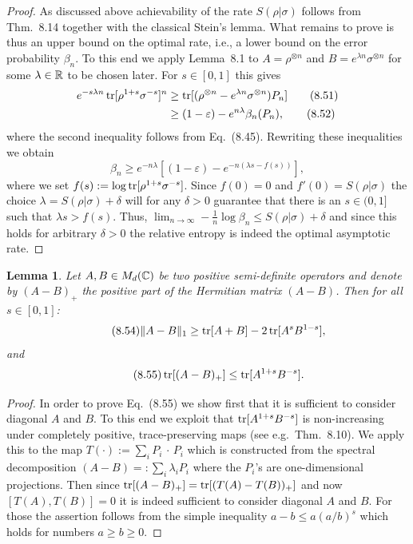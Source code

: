 \documentclass[11pt,a4paper]{article}
\theoremstyle{plain}
\newtheorem{lemma}{Lemma}[section]
\theoremstyle{definition}
\theoremstyle{remark}
\begin{document}
\begin{proof}
    As discussed above achievability of the rate $S(\rho|\sigma)$ follows from Thm.~8.14 together with the classical Stein's lemma.
    What remains to prove is thus an upper bound on the optimal rate, i.e., a lower bound on the error probability $\beta_n$.
    To this end we apply Lemma~8.1 to $A=\rho^{\otimes n}$ and $B=e^{\lambda n}\sigma^{\otimes n}$ for some $\lambda\in\mathbb{R}$ to be chosen later.
    For $s\in[0,1]$ this gives
    \begin{align}
        e^{-s\lambda n}\operatorname{tr}[\rho^{1+s}\sigma^{-s}]^{n}
         &\ge \operatorname{tr}[(\rho^{\otimes n}-e^{\lambda n}\sigma^{\otimes n})P_n] \tag{8.51}\\
         &\ge (1-\varepsilon) - e^{n\lambda}\beta_n(P_n), \tag{8.52}
    \end{align}
    where the second inequality follows from Eq.~(8.45). Rewriting these inequalities we obtain
    \begin{equation}\tag{8.53}
        \beta_n \ge e^{-n\lambda}\left[(1-\varepsilon) - e^{-n(\lambda s - f(s))}\right],
    \end{equation}
    where we set $f(s):=\log\operatorname{tr}[\rho^{1+s}\sigma^{-s}]$. Since $f(0)=0$ and $f'(0)=S(\rho|\sigma)$ the choice $\lambda=S(\rho|\sigma)+\delta$
    will for any $\delta>0$ guarantee that there is an $s\in(0,1]$ such that $\lambda s>f(s)$.
    Thus, $\lim_{n\to\infty}-\frac{1}{n}\log\beta_n \le S(\rho|\sigma)+\delta$ and since this holds for arbitrary $\delta>0$ the relative entropy is indeed the optimal asymptotic rate.
\end{proof}

\begin{lemma}
    Let $A,B\in M_d(\mathbb{C})$ be two positive semi-definite operators and denote by $(A-B)_+$ the positive part of the Hermitian matrix $(A-B)$.
    Then for all $s\in[0,1]$:
    \begin{equation}\tag{8.54}
        \|A-B\|_1 \ge \operatorname{tr}[A+B] - 2\operatorname{tr}[A^sB^{1-s}],
    \end{equation}
    and
    \begin{equation}\tag{8.55}
        \operatorname{tr}[(A-B)_+] \le \operatorname{tr}[A^{1+s}B^{-s}].
    \end{equation}
\end{lemma}

\begin{proof}
    In order to prove Eq.~(8.55) we show first that it is sufficient to consider diagonal $A$ and $B$.
    To this end we exploit that $\operatorname{tr}[A^{1+s}B^{-s}]$ is non-increasing under completely positive, trace-preserving maps
    (see e.g.\ Thm.~8.10). We apply this to the map $T(\cdot):=\sum_i P_i\,\cdot\, P_i$ which is constructed from the spectral decomposition
    $(A-B)=:\sum_i \lambda_i P_i$ where the $P_i$'s are one-dimensional projections. Then since
    $\operatorname{tr}[(A-B)_+]=\operatorname{tr}[(T(A)-T(B))_+]$ and now $[T(A),T(B)]=0$ it is indeed sufficient to consider diagonal $A$ and $B$.
    For those the assertion follows from the simple inequality $a-b\le a(a/b)^s$ which holds for numbers $a\ge b\ge 0$.
\end{proof}
\end{document}
